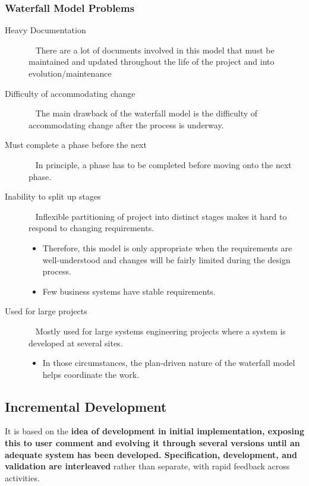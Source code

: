 \documentclass{report}
\begin{document}
\subsubsection{Waterfall Model Problems}
\begin{description}
  \item [Heavy Documentation] \ \newline
  There are a lot of documents involved in this model that must be maintained and updated throughout the life of the project and into evolution/maintenance
  \item [Difficulty of accommodating change] \ \newline
  The main drawback of the waterfall model is the difficulty of accommodating change after the process is underway.
  \item [Must complete a phase before the next] \ \newline 
  In principle, a phase has to be completed before moving onto the next phase.
  \item [Inability to split up stages] \ \newline
  Inflexible partitioning of project into distinct stages makes it hard to respond to changing requirements.
  \begin{itemize}
    \item Therefore, this model is only appropriate when the requirements are well-understood and changes will be fairly limited during the design process.
    \item Few business systems have stable requirements.
  \end{itemize}
  \item [Used for large projects] \ \newline
   Mostly used for large systems engineering projects where a system is developed at several sites.
  \begin{itemize}
    \item In those circumstances, the plan-driven nature of the waterfall model helps coordinate the work.
  \end{itemize}
\end{description}

\newpage
\subsection{Incremental Development}
It is based on the \textbf{idea of development in initial implementation, exposing this to user comment and evolving it through several versions until an adequate system has been developed. Specification, development, and validation are interleaved} rather than separate, with rapid feedback across activities.
\end{document}
